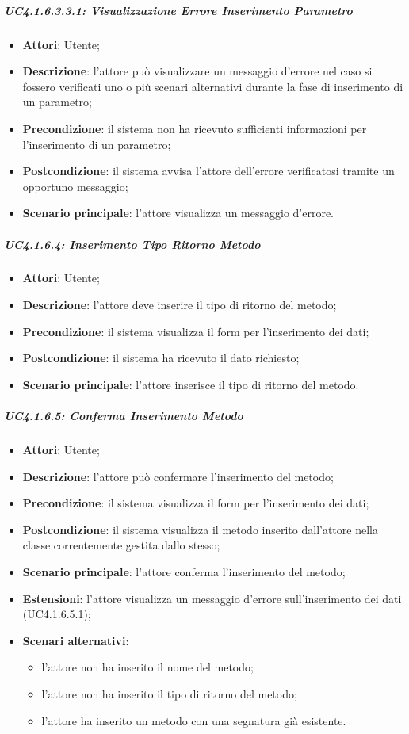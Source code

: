 \subparagraph{UC4.1.6.3.3.1: Visualizzazione Errore Inserimento Parametro }
\label{UC4.1.6.3.3.1}
\begin{itemize}
\item \textbf{Attori}: Utente;
\item \textbf{Descrizione}: l'attore può visualizzare un messaggio d'errore nel caso si fossero verificati uno o più scenari alternativi durante la fase di inserimento di un parametro;	
\item \textbf{Precondizione}: il sistema non ha ricevuto sufficienti informazioni per l'inserimento di un parametro;	
\item \textbf{Postcondizione}: il sistema avvisa l'attore dell'errore verificatosi tramite un opportuno messaggio;	
\item \textbf{Scenario principale}:
l'attore visualizza un messaggio d'errore.	
\end{itemize}

\subparagraph{UC4.1.6.4: Inserimento Tipo Ritorno Metodo}
\label{UC4.1.6.4}
\begin{itemize}
\item \textbf{Attori}: Utente;
\item \textbf{Descrizione}: l'attore deve inserire il tipo di ritorno del metodo;
\item \textbf{Precondizione}: il sistema visualizza il form per l'inserimento dei dati;
\item \textbf{Postcondizione}: il sistema ha ricevuto il dato richiesto;
\item \textbf{Scenario principale}:
l'attore inserisce il tipo di ritorno del metodo.
\end{itemize}

\subparagraph{UC4.1.6.5: Conferma Inserimento Metodo}
\label{UC4.1.6.5}
\begin{itemize}
\item \textbf{Attori}: Utente;
\item \textbf{Descrizione}: l'attore può confermare l'inserimento del metodo;	
\item \textbf{Precondizione}: il sistema visualizza il form per l'inserimento dei dati;	
\item \textbf{Postcondizione}: il sistema visualizza il metodo inserito dall'attore nella classe correntemente gestita dallo stesso;	
\item \textbf{Scenario principale}:
l'attore conferma l'inserimento del metodo;	
\item \textbf{Estensioni}:
l'attore visualizza un messaggio d'errore sull'inserimento dei dati (UC4.1.6.5.1);	
\item \textbf{Scenari alternativi}:
\begin{itemize}
	\item l'attore non ha inserito il nome del metodo;
	\item l'attore non ha inserito il tipo di ritorno del metodo;
	\item l'attore ha inserito un metodo con una segnatura già esistente.
\end{itemize}
\end{itemize}

